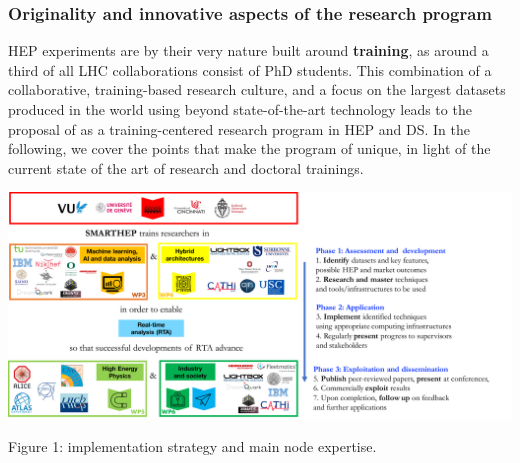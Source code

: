


 
\vspace{-2mm}
\subsubsection{Originality and innovative aspects of the research program} 
\label{sub:Originality}

HEP experiments are by their very nature built around \textbf{training}, as around a third of all LHC collaborations consist of PhD students.
This combination of a collaborative, training-based research culture, and a focus on the largest datasets produced in the world using beyond state-of-the-art technology leads to the proposal of \acronym as a training-centered research program in HEP and DS.
In the following, we cover the points that make the program of \acronym unique, in light of the current state of the art of research and doctoral trainings. 

\includegraphics[width=\textwidth]{figs/NetworkCompositionCombinedImplementation} %
\begin{center}\footnotesize \label{fig:implementation}
Figure 1: \acronym implementation strategy and main node expertise.
\end{center}%
\normalsize 
\vspace{-2mm}
 
